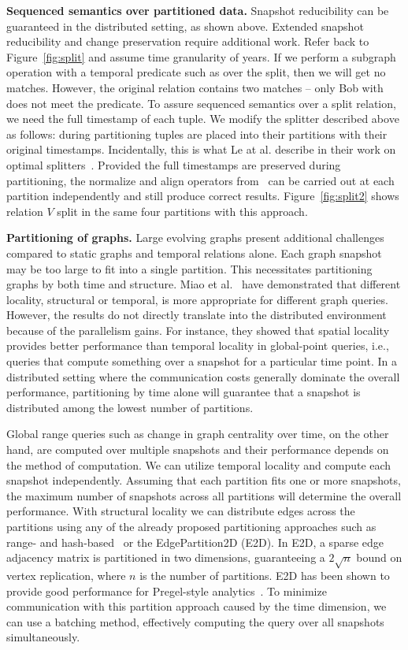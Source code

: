 {\bf Sequenced semantics over partitioned data.}  Snapshot
reducibility can be guaranteed in the distributed setting, as shown
above.  Extended snapshot reducibility and change preservation require
additional work.  Refer back to Figure~\ref{fig:split} and assume time
granularity of years.  If we perform a subgraph operation with a
temporal predicate such as  over the split, then we
will get no matches.  However, the original relation contains two
matches -- only Bob with  does not meet the predicate.
To assure sequenced semantics over a split relation, we need the full
timestamp of each tuple.  We modify the splitter described above as
follows: during partitioning tuples are placed into their partitions
with their original timestamps.  Incidentally, this is what Le at
al. describe in their work on optimal splitters~\cite{Le2013}.
Provided the full timestamps are preserved during partitioning, the
normalize and align operators from~\cite{Dignos2012} can be carried
out at each partition independently and still produce correct results.
Figure~\ref{fig:split2} shows relation $V$ split in the same four
partitions with this approach.

{\bf Partitioning of graphs.}  Large evolving graphs present
additional challenges compared to static graphs and temporal relations
alone.  Each graph snapshot may be too large to fit into a single
partition.  This necessitates partitioning graphs by both time and
structure.  Miao et al.~\cite{Miao2015} have demonstrated that
different locality, structural or temporal, is more appropriate for
different graph queries.  However, the results do not directly
translate into the distributed environment because of the parallelism
gains.  For instance, they showed that spatial locality provides
better performance than temporal locality in global-point queries,
i.e., queries that compute something over a snapshot for a particular
time point.  In a distributed setting where the communication costs
generally dominate the overall performance, partitioning by time alone
will guarantee that a snapshot is distributed among the lowest number
of partitions.  

Global range queries such as change in graph centrality over time, on
the other hand, are computed over multiple snapshots and their
performance depends on the method of computation.  We can utilize
temporal locality and compute each snapshot independently.  Assuming
that each partition fits one or more snapshots, the maximum number of
snapshots across all partitions will determine the overall
performance.  With structural locality we can distribute edges across
the partitions using any of the already proposed partitioning
approaches such as range- and hash-based~\cite{Seo2013} or the
EdgePartition2D (E2D).  In E2D, a sparse edge adjacency matrix is
partitioned in two dimensions, guaranteeing a $2 \sqrt{n}$ bound on
vertex replication, where $n$ is the number of partitions. E2D has
been shown to provide good performance for Pregel-style
analytics~\cite{DBLP:conf/osdi/GonzalezXDCFS14}.  To minimize
communication with this partition approach caused by the time
dimension, we can use a batching method, effectively computing the
query over all snapshots simultaneously.  


